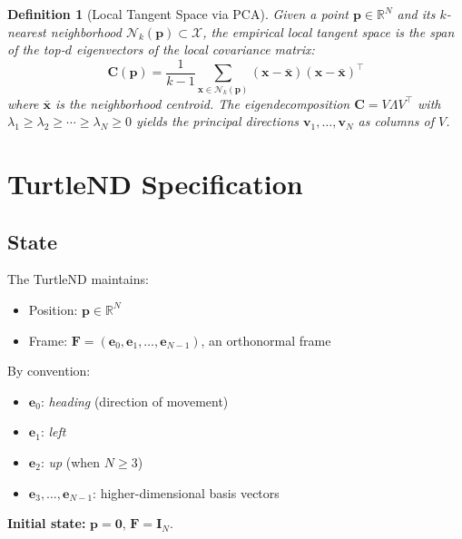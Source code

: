 \documentclass[11pt,letterpaper]{article}
\newtheorem{definition}{Definition}[section]
\newcommand{\R}{\mathbb{R}}
\newcommand{\frame}{\mathbf{F}}
\newcommand{\pos}{\mathbf{p}}
\newcommand{\basis}{\mathbf{e}}
\newcommand{\cov}{\mathbf{C}}
\newcommand{\eye}{\mathbf{I}}
\begin{document}
\begin{definition}[Local Tangent Space via PCA]
\label{def:tangent}
Given a point $\pos \in \R^N$ and its $k$-nearest neighborhood
$\mathcal{N}_k(\pos) \subset \mathcal{X}$, the \emph{empirical local
tangent space} is the span of the top-$d$ eigenvectors of the local
covariance matrix:
\begin{equation}
  \cov(\pos) = \frac{1}{k-1} \sum_{\mathbf{x} \in \mathcal{N}_k(\pos)} (\mathbf{x} - \bar{\mathbf{x}})(\mathbf{x} - \bar{\mathbf{x}})^\top
\end{equation}
where $\bar{\mathbf{x}}$ is the neighborhood centroid. The eigendecomposition
$\cov = V \Lambda V^\top$ with $\lambda_1 \geq \lambda_2 \geq \cdots \geq \lambda_N \geq 0$
yields the principal directions $\mathbf{v}_1, \ldots, \mathbf{v}_N$ as
columns of $V$.
\end{definition}

\section{TurtleND Specification}
\label{sec:turtlend}

\subsection{State}

The TurtleND maintains:
\begin{itemize}[nosep]
  \item Position: $\pos \in \R^N$
  \item Frame: $\frame = (\basis_0, \basis_1, \ldots, \basis_{N-1})$, an orthonormal frame
\end{itemize}

By convention:
\begin{itemize}[nosep]
  \item $\basis_0$: \emph{heading} (direction of movement)
  \item $\basis_1$: \emph{left}
  \item $\basis_2$: \emph{up} (when $N \geq 3$)
  \item $\basis_3, \ldots, \basis_{N-1}$: higher-dimensional basis vectors
\end{itemize}

\noindent\textbf{Initial state:} $\pos = \mathbf{0}$, $\frame = \eye_N$.
\end{document}
